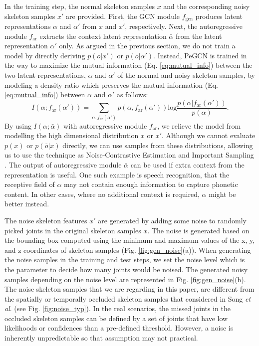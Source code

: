 \documentclass[runningheads]{llncs}
\newcommand{\etal}{\textit{et al}. }
\begin{document}
In the training step, the normal skeleton samples $x$ and the corresponding noisy skeleton samples $x'$ are provided. First, the GCN module $f_{\text{gcn}}$ produces latent representations $\alpha$ and $\alpha'$ from $x$ and $x'$, respectively. Next, the autoregressive module $f_{\text{ar}}$ extracts the context latent representation $\bar{\alpha}$ from the latent representation $\alpha'$ only. As argued in the previous section, we do not train a model by directly deriving $p(o|x')$ or $p(o|\alpha')$. Instead, PeGCN is trained in the way to maximize the mutual information (Eq. \ref{eq:mutual_info}) between the two latent representations, $\alpha$ and $\alpha'$ of the normal and noisy skeleton samples, by modeling a density ratio which preserves the mutual information (Eq. \ref{eq:mutual_info}) between $\alpha$ and $\alpha'$ as follows:
\begin{equation}
I(\alpha;f_{\text{ar}}(\alpha')) = \sum_{\alpha,f_{\text{ar}}(\alpha')}p(\alpha,f_{\text{ar}}(\alpha'))\text{log}\frac{p(\alpha|f_{\text{ar}}(\alpha'))}{p(\alpha)}.
\label{eq:ml_autoregressive}
\end{equation}
By using $I(\alpha;\bar{\alpha})$ with autoregressive module $f_{\text{ar}}$, we relieve the model from modelling the high dimensional distribution $x$ or $x'$. Although we cannot evaluate $p(x)$ or $p(\bar{o}|x)$ directly, we can use samples from these distributions, allowing us to use the technique as Noise-Contrastive Estimation \cite{gutmann2010noise,mnih2012fast,jozefowicz2016exploring} and Important Sampling \cite{bengio2008adaptive}. The output of autoregressive module $\bar{\alpha}$ can be used if extra context from the representation is useful. One such example is speech recognition, that the receptive field of $\alpha$ may not contain enough information to capture phonetic content. In other cases, where no additional context is required, $\alpha$ might be better instead. 

The noise skeleton features $x'$ are generated by adding some noise to randomly picked joints in the original skeleton samples $x$. The noise is generated based on the bounding box computed using the minimum and maximum values of the x, y, and z coordinates of skeleton samples (Fig. \ref{fig:gen_noise}(a)). When generating the noise samples in the training and test steps, we set the noise level which is the parameter to decide how many joints would be noised. The generated noisy samples depending on the noise level are represented in Fig. \ref{fig:gen_noise}(b). The noise skeleton samples that we are regarding in this paper, are different from the spatially or temporally occluded skeleton samples that considered in Song \etal \cite{song2019richly} (see Fig. \ref{fig:noise_typ}). In the real scenarios, the missed joints in the occluded skeleton samples can be defined by a set of joints that have low likelihoods or confidences than a pre-defined threshold. However, a noise is inherently unpredictable so that assumption may not practical. 
\end{document}
